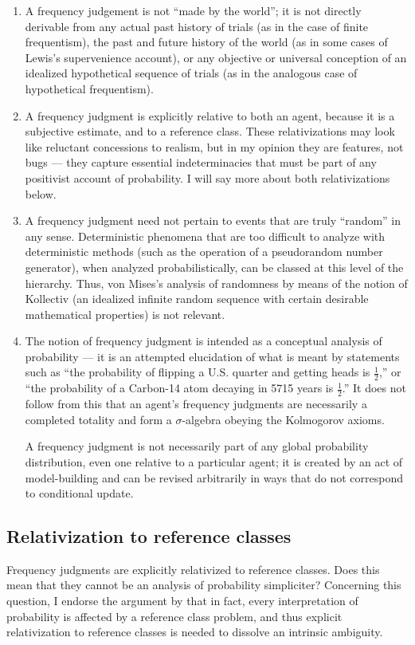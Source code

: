 \documentclass[letterpaper,12pt]{article}
\begin{document}
\begin{enumerate}
\item
A frequency judgement is not ``made by the world''; it is not directly derivable from any actual past history of trials (as in the case of finite frequentism), the past and future history of the world (as in some cases of Lewis's supervenience account), or any objective or universal conception of an idealized hypothetical sequence of trials (as in the analogous case of hypothetical frequentism).

\item
A frequency judgment is explicitly relative to both an agent, because it is a subjective estimate, and to a reference class. These relativizations may look like reluctant concessions to realism, but in my opinion they are features, not bugs --- they capture essential indeterminacies that must be part of any positivist account of probability. I will say more about both relativizations below.

\item
A frequency judgment need not pertain to events that are truly ``random'' in any sense. Deterministic phenomena that are too difficult to analyze with deterministic methods (such as the operation of a pseudorandom number generator), when analyzed probabilistically, can be classed at this level of the hierarchy. Thus, von Mises's analysis of randomness by means of the notion of Kollectiv (an idealized infinite random sequence with certain desirable mathematical properties) is not relevant.

\item
The notion of frequency judgment is intended as a conceptual analysis of probability --- it is an attempted elucidation of what is meant by statements such as ``the probability of flipping a U.S. quarter and getting heads is $\frac{1}{2}$,'' or ``the probability of a Carbon-14 atom decaying in 5715 years is $\frac{1}{2}$.'' It does not follow from this that an agent's frequency judgments are necessarily a completed totality and form a $\sigma$-algebra obeying the Kolmogorov axioms.

A frequency judgment is not necessarily part of any global probability distribution, even one relative to a particular agent; it is created by an act of model-building and can be revised arbitrarily in ways that do not correspond to conditional update.
\end{enumerate}

\subsection{Relativization to reference classes}
\label{sec:relativizationToReferenceClasses}
Frequency judgments are explicitly relativized to reference classes. Does this mean that they cannot be an analysis of probability simpliciter? Concerning this question, I endorse the argument by \cite{DBLP:journals/synthese/Hajek07} that in fact, every interpretation of probability is affected by a reference class problem, and thus explicit relativization to reference classes is needed to dissolve an intrinsic ambiguity.
\end{document}
